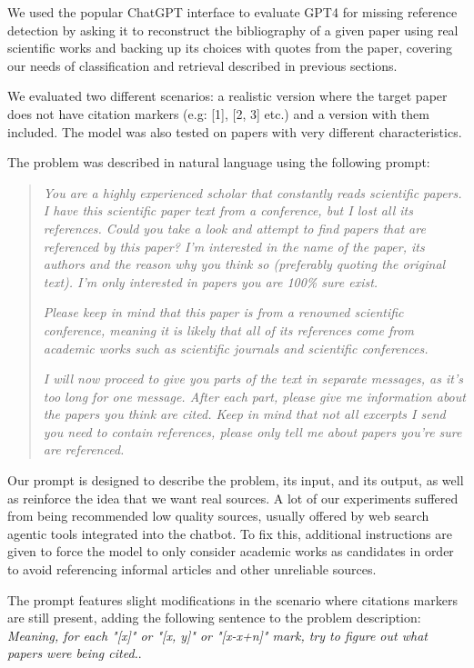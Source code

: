 \documentclass[12pt,a4paper]{report}
\begin{document}
We used the popular ChatGPT interface to evaluate GPT4 \cite{Achiam2023GPT4TR} for missing reference detection by asking it to reconstruct the bibliography of a given paper using real scientific works and backing up its choices with quotes from the paper, covering our needs of classification and retrieval described in previous sections.

We evaluated two different scenarios: a realistic version where the target paper does not have citation markers (e.g: [1], [2, 3] etc.) and a version with them included. The model was also tested on papers with very different characteristics.

The problem was described in natural language using the following prompt:

\begin{quote}
\textit{You are a highly experienced scholar that constantly reads scientific papers. I have this scientific paper text from a conference, but I lost all its references. Could you take a look and attempt to find papers that are referenced by this paper? I'm interested in the name of the paper, its authors and the reason why you think so (preferably quoting the original text). I'm only interested in papers you are 100\% sure exist.}

\textit{Please keep in mind that this paper is from a renowned scientific conference, meaning it is likely that all of its references come from academic works such as scientific journals and scientific conferences.}

\textit{I will now proceed to give you parts of the text in separate messages, as it's too long for one message. After each part, please give me information about the papers you think are cited. Keep in mind that not all excerpts I send you need to contain references, please only tell me about papers you're sure are referenced.}
\end{quote}

Our prompt is designed to describe the problem, its input, and its output, as well as reinforce the idea that we want real sources. A lot of our experiments suffered from being recommended low quality sources, usually offered by web search agentic tools integrated into the chatbot. To fix this, additional instructions are given to force the model to only consider academic works as candidates in order to avoid referencing informal articles and other unreliable sources.

The prompt features slight modifications in the scenario where citations markers are still present, adding the following sentence to the problem description: \textit{Meaning, for each "[x]" or "[x, y]" or "[x-x+n]" mark, try to figure out what papers were being cited.}.
\end{document}
